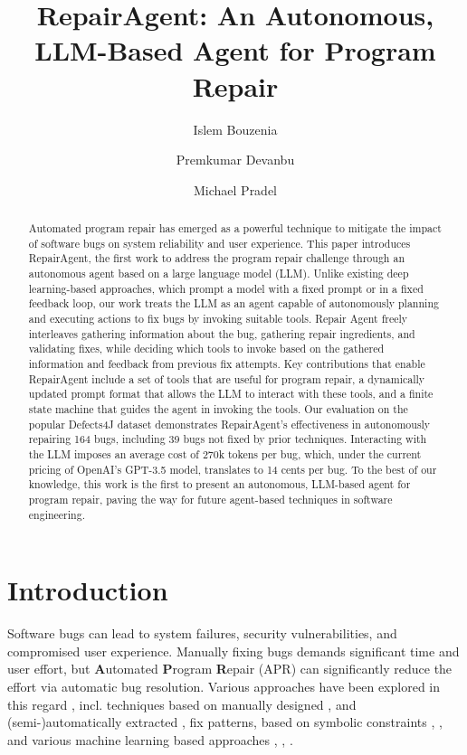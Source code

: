 \documentclass[manuscript,review]{acmart}
\title{RepairAgent: An Autonomous, LLM-Based Agent for Program Repair}
\author{Islem Bouzenia}
\affiliation{%
  \institution{University of Stuttgart}
  \country{Germany}
}
\author{Premkumar Devanbu}
\affiliation{%
  \institution{UC Davis}
  \country{USA}
}
\author{Michael Pradel}
\affiliation{%
  \institution{University of Stuttgart}
  \country{Germany}
}
\begin{document}
\begin{abstract}
Automated program repair has emerged as a powerful technique to mitigate the impact of software bugs on system reliability and user experience. This paper introduces RepairAgent, the first work to address the program repair challenge through an autonomous agent based on a large language model (LLM). Unlike existing deep learning-based approaches, which prompt a model with a fixed prompt or in a fixed feedback loop, our work treats the LLM as an agent capable of autonomously planning and executing actions to fix bugs by invoking suitable tools. Repair Agent freely interleaves gathering information about the bug, gathering repair ingredients, and validating fixes, while deciding which tools to invoke based on the gathered information and feedback from previous fix attempts. Key contributions that enable RepairAgent include a set of tools that are useful for program repair, a dynamically updated prompt format that allows the LLM to interact with these tools, and a finite state machine that guides the agent in invoking the tools. Our evaluation on the popular Defects4J dataset demonstrates RepairAgent's effectiveness in autonomously repairing 164 bugs, including 39 bugs not fixed by prior techniques. Interacting with the LLM imposes an average cost of 270k tokens per bug, which, under the current pricing of OpenAI's GPT-3.5 model, translates to 14 cents per bug. To the best of our knowledge, this work is the first to present an autonomous, LLM-based agent for program repair, paving the way for future agent-based techniques in software engineering.
\end{abstract}

\maketitle

\section{Introduction}
Software bugs can lead to system failures, security vulnerabilities, and compromised user experience. Manually fixing bugs demands significant time and user effort, but \textbf{A}utomated \textbf{P}rogram \textbf{R}epair (APR) can significantly reduce the effort via automatic bug resolution. Various approaches have been explored in this regard \cite{legoues2019automated}, incl. techniques based on manually designed \cite{legoues2012genprog}, \cite{liu2019tbar} and (semi-)automatically extracted \cite{kim2013automatic}, \cite{bader2019getafix} fix patterns, based on symbolic constraints \cite{nguyen2013semfix}, \cite{xuan2016nopol}, and various machine learning based approaches \cite{long2016automatic}, \cite{gupta2017deepfix}, \cite{tufano2019learning}.
\end{document}

